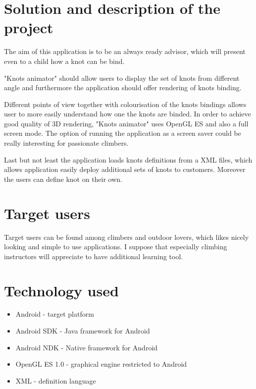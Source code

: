 
\section*{Solution and description of the project} %
\label{sec:Solution}
The aim of this application is to be an always ready advisor, which will
present even to a child how a knot can be bind. 

"Knots animator" should  allow users to display the set of knots from different angle
and furthermore the application should offer rendering of knots binding.

Different points of view together with colourisation of the knots bindings
allows user to more easily understand how one the knots are binded.
In order to achieve good quality of 3D rendering, "Knots animator" 
uses OpenGL ES and also a full screen mode. 
The option of running the application as a screen saver could be really interesting
for passionate climbers.

Last but not least the application loads knots definitions from a XML files,
which allows application easily deploy additional sets of knots to customers.
Moreover the users can define knot on their own.

\section*{Target users} %
\label{sec:Target users}
Target users can be found among climbers and outdoor lovers,
which likes nicely looking and simple to use applications.  
I suppose that especially climbing instructors will appreciate
to have additional learning tool.

\section*{Technology used} %
\label{sec:Technology used}

\begin{itemize}
  \item Android - target platform 
  \item Android SDK - Java framework for Android
  \item Android NDK - Native framework for Android
  \item OpenGL ES 1.0 - graphical engine restricted to Android
  \item XML - definition language 
\end{itemize}

